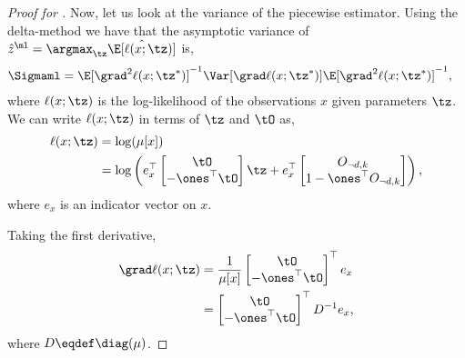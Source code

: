 \begin{proof}[Proof for ]
  Now, let us look at the variance of the piecewise estimator.  Using
  the delta-method \cite{vaart98asymptotic} we have that the asymptotic
  variance of 
  $\hat{z}^\ml = \argmax_{\tz} \hat\E[\ell(x ; \tz)]$ is,
  \begin{align*}
    \Sigmaml &= \E[\grad^2 \ell(x ; \tz^*)]^{-1} \Var[\grad \ell(x ; \tz^*)] \E[\grad^2 \ell(x ; \tz^*)]^{-1},
  \end{align*}
  where $\ell(x;\tz)$ is the log-likelihood of the observations $x$
  given parameters $\tz$. We can write $\ell(x;\tz)$ in terms of $\tz$
  and $\tO$ as,
  \begin{align*}
    \ell(x;\tz) 
              &= \log( \mu[x] ) \\
              &= \log \left( 
    e_x^\top \begin{bmatrix}
      \tO \\
      - \ones^\top\tO
    \end{bmatrix} \tz 
    + 
    e_x^\top \begin{bmatrix}
      O_{\neg d, k} \\
      1 - \ones^\top O_{\neg d, k}
    \end{bmatrix}
    \right),
  \end{align*}
where $e_x$ is an indicator vector on $x$.

Taking the first derivative,
\begin{align}
  \grad \ell(x; \tz)
  &= 
  \frac{
  1}{\mu[x]}
  \begin{bmatrix}
    \tO \\
    -\ones^\top \tO
  \end{bmatrix}^\top
 e_x \nonumber \\
  &= 
  \begin{bmatrix}
    \tO \\
    -\ones^\top \tO
  \end{bmatrix}^\top
  D^{-1} e_x, \label{eqn:lhood-grad}
\end{align}
where $D \eqdef \diag(\mu)$.


\end{proof}
